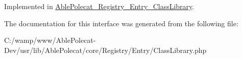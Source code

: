 Implemented in \hyperlink{class_able_polecat___registry___entry___class_library_a2b16efeebea2966b34d452b3f53c4aea}{Able\+Polecat\+\_\+\+Registry\+\_\+\+Entry\+\_\+\+Class\+Library}.



The documentation for this interface was generated from the following file\+:\begin{DoxyCompactItemize}
\item 
C\+:/wamp/www/\+Able\+Polecat-\/\+Dev/usr/lib/\+Able\+Polecat/core/\+Registry/\+Entry/Class\+Library.\+php\end{DoxyCompactItemize}
